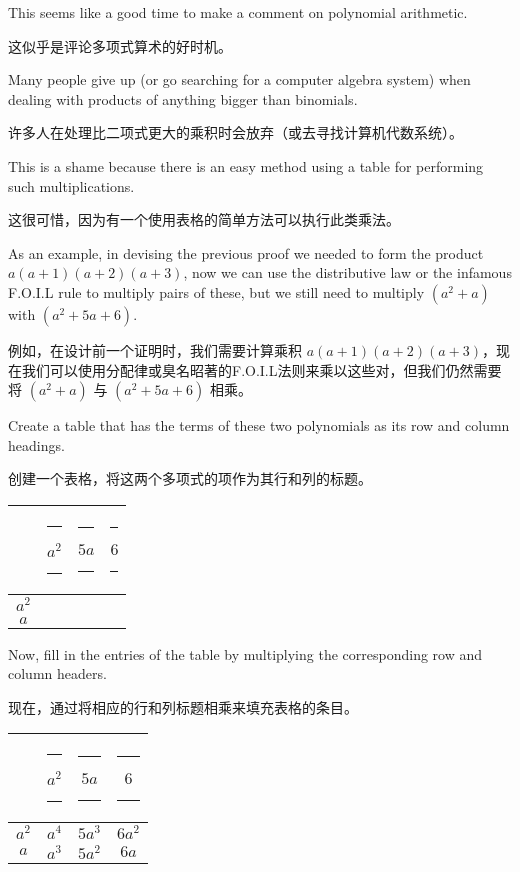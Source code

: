 This seems like a good time to make a comment on polynomial arithmetic.

这似乎是评论多项式算术的好时机。

Many people give up (or go searching for a computer algebra system)
when dealing with products of anything bigger than binomials.

许多人在处理比二项式更大的乘积时会放弃（或去寻找计算机代数系统）。

This
is a shame because there is an easy method using a table for performing
such multiplications.

这很可惜，因为有一个使用表格的简单方法可以执行此类乘法。

As an example, in devising the previous proof we
needed to form the product $a(a+1)(a+2)(a+3)$, now we can use the
distributive law or the infamous F.O.I.L rule to multiply pairs of these,
but we still need to multiply $(a^2+a)$ with $(a^2+5a+6)$.

例如，在设计前一个证明时，我们需要计算乘积 $a(a+1)(a+2)(a+3)$，现在我们可以使用分配律或臭名昭著的F.O.I.L法则来乘以这些对，但我们仍然需要将 $(a^2+a)$ 与 $(a^2+5a+6)$ 相乘。

Create a
table that has the terms of these two polynomials as its row and column
headings.

创建一个表格，将这两个多项式的项作为其行和列的标题。

\begin{center}
      \begin{tabular}{c|ccc}
                  & \rule{3pt}{0pt} $a^2$ \rule{3pt}{0pt} & \rule{3pt}{0pt}  $5a$ \rule{3pt}{0pt} & \rule{3pt}{0pt}  $6$  \rule{3pt}{0pt} \\ \hline
            $a^2$ &                                       &                                       &                                       \\
            $a$   &                                       &                                       &                                       \\
      \end{tabular}
\end{center}

Now, fill in the entries of the table by multiplying the corresponding
row and column headers.

现在，通过将相应的行和列标题相乘来填充表格的条目。

\begin{center}
      \begin{tabular}{c|ccc}
                  & \rule{3pt}{0pt}   $a^2$ \rule{3pt}{0pt} & \rule{3pt}{0pt}  $5a$  \rule{3pt}{0pt} & \rule{3pt}{0pt} $6$  \rule{3pt}{0pt} \\ \hline
            $a^2$ & $a^4$                                   & $5a^3$                                 & $6a^2$                               \\
            $a$   & $a^3$                                   & $5a^2$                                 & $6a$                                 \\
      \end{tabular}
\end{center}

